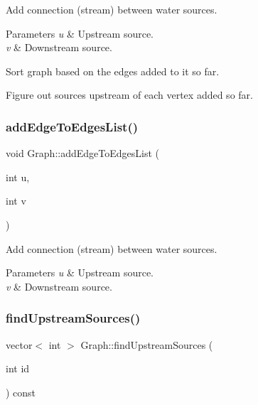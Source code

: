Add connection (stream) between water sources. 
\begin{DoxyParams}{Parameters}
{\em u} & Upstream source. \\
\hline
{\em v} & Downstream source. \\
\hline
\end{DoxyParams}
Sort graph based on the edges added to it so far.

Figure out sources upstream of each vertex added so far. \mbox{\label{classGraph_a6f175234dc3c87150a53eab5c4e586ef_a6f175234dc3c87150a53eab5c4e586ef}} 
\subsubsection{\texorpdfstring{add\+Edge\+To\+Edges\+List()}{addEdgeToEdgesList()}}
{\footnotesize\ttfamily void Graph\+::add\+Edge\+To\+Edges\+List (\begin{DoxyParamCaption}\item[{int}]{u,  }\item[{int}]{v }\end{DoxyParamCaption})\hspace{0.3cm}{\ttfamily [protected]}}

Add connection (stream) between water sources. 
\begin{DoxyParams}{Parameters}
{\em u} & Upstream source. \\
\hline
{\em v} & Downstream source. \\
\hline
\end{DoxyParams}
\mbox{\label{classGraph_a17fc2fd799b56ac496aa57036f3696d7_a17fc2fd799b56ac496aa57036f3696d7}} 
\subsubsection{\texorpdfstring{find\+Upstream\+Sources()}{findUpstreamSources()}}
{\footnotesize\ttfamily vector$<$ int $>$ Graph\+::find\+Upstream\+Sources (\begin{DoxyParamCaption}\item[{int}]{id }\end{DoxyParamCaption}) const\hspace{0.3cm}{\ttfamily [protected]}}

